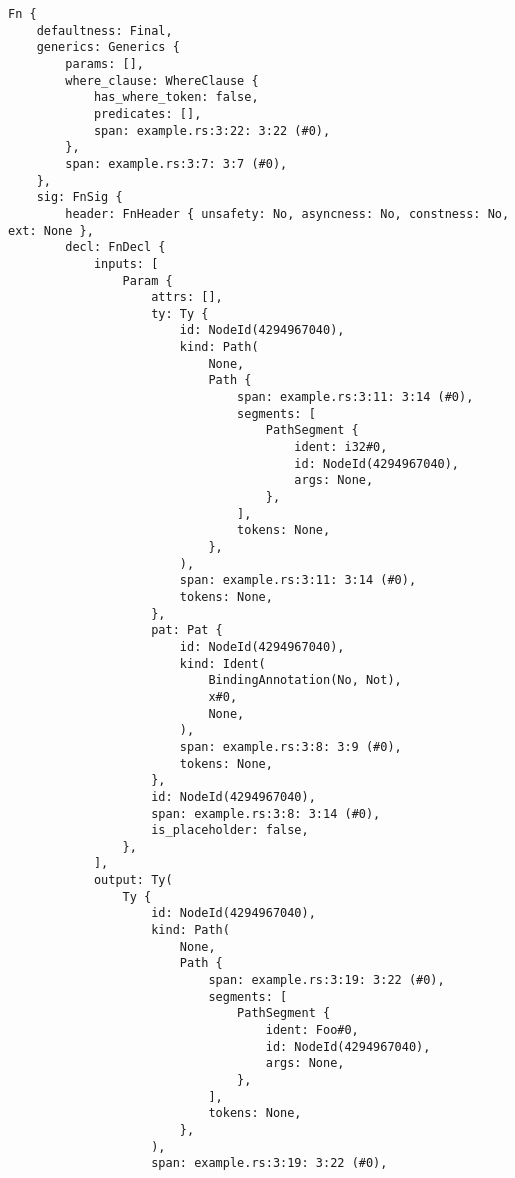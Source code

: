 \documentclass[
  11pt,
]{report}
\begin{document}
\begin{verbatim}
Fn {
    defaultness: Final,
    generics: Generics {
        params: [],
        where_clause: WhereClause {
            has_where_token: false,
            predicates: [],
            span: example.rs:3:22: 3:22 (#0),
        },
        span: example.rs:3:7: 3:7 (#0),
    },
    sig: FnSig {
        header: FnHeader { unsafety: No, asyncness: No, constness: No, ext: None },
        decl: FnDecl {
            inputs: [
                Param {
                    attrs: [],
                    ty: Ty {
                        id: NodeId(4294967040),
                        kind: Path(
                            None,
                            Path {
                                span: example.rs:3:11: 3:14 (#0),
                                segments: [
                                    PathSegment {
                                        ident: i32#0,
                                        id: NodeId(4294967040),
                                        args: None,
                                    },
                                ],
                                tokens: None,
                            },
                        ),
                        span: example.rs:3:11: 3:14 (#0),
                        tokens: None,
                    },
                    pat: Pat {
                        id: NodeId(4294967040),
                        kind: Ident(
                            BindingAnnotation(No, Not),
                            x#0,
                            None,
                        ),
                        span: example.rs:3:8: 3:9 (#0),
                        tokens: None,
                    },
                    id: NodeId(4294967040),
                    span: example.rs:3:8: 3:14 (#0),
                    is_placeholder: false,
                },
            ],
            output: Ty(
                Ty {
                    id: NodeId(4294967040),
                    kind: Path(
                        None,
                        Path {
                            span: example.rs:3:19: 3:22 (#0),
                            segments: [
                                PathSegment {
                                    ident: Foo#0,
                                    id: NodeId(4294967040),
                                    args: None,
                                },
                            ],
                            tokens: None,
                        },
                    ),
                    span: example.rs:3:19: 3:22 (#0),

\end{verbatim}
\end{document}

